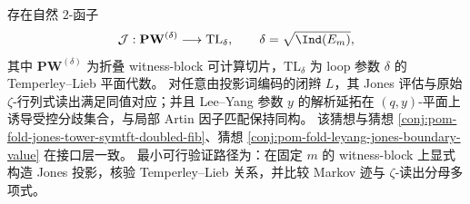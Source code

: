 \begin{conjecture}\label{conj:conclusion-fold-jones-spectral-topological-equivalence}
存在自然 \(2\)-函子
\[
\mathcal J:\mathbf{PW}^{(\delta)}\longrightarrow \mathrm{TL}_{\delta},
\qquad
\delta=\sqrt{\Ind(E_m)},
\]
其中 \(\mathbf{PW}^{(\delta)}\) 为折叠 witness-block 可计算切片，\(\mathrm{TL}_{\delta}\) 为 loop 参数 \(\delta\) 的 Temperley--Lieb 平面代数。
对任意由投影词编码的闭辫 \(L\)，其 Jones 评估与原始 \(\zeta\)-行列式读出满足同值对应；并且 Lee--Yang 参数 \(y\) 的解析延拓在 \((q,y)\)-平面上诱导受控分歧集合，与局部 Artin 因子匹配保持同构。
该猜想与猜想 \ref{conj:pom-fold-jones-tower-symtft-doubled-fib}、猜想 \ref{conj:pom-fold-leyang-jones-boundary-value} 在接口层一致。
最小可行验证路径为：在固定 \(m\) 的 witness-block 上显式构造 Jones 投影，核验 Temperley--Lieb 关系，并比较 Markov 迹与 \(\zeta\)-读出分母多项式。
\end{conjecture}

\endinput
